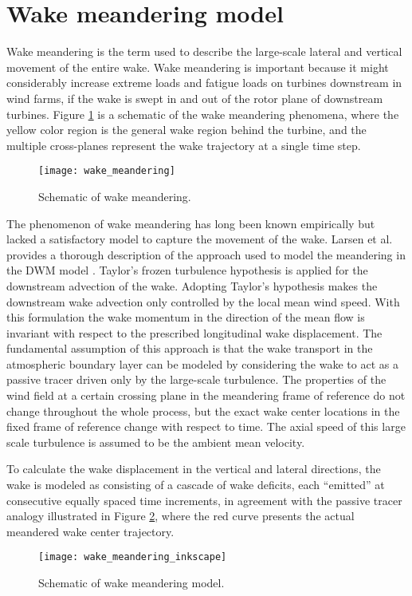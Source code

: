 \documentclass{umthesis}
\begin{document}
\section{Wake meandering model} \label{sec:wake_meandering}
Wake meandering is the term used to describe the large-scale lateral and vertical movement of the entire wake. Wake meandering is important because it might considerably increase extreme loads and fatigue loads on turbines downstream in wind farms, if the wake is swept in and out of the rotor plane of downstream turbines. Figure \ref{fig:wake_meandering} is a schematic of the wake meandering phenomena, where the yellow color region is the general wake region behind the turbine, and the multiple cross-planes represent the wake trajectory at a single time step.

\begin{figure}
  \centering
  \texttt{[image: wake\_meandering]}
  \caption{Schematic of wake meandering.}\label{fig:wake_meandering}
\end{figure}

The phenomenon of wake meandering has long been known empirically but lacked a satisfactory model to capture the movement of the wake. Larsen et al. provides a thorough description of the approach used to model the meandering in the DWM model \cite{Larsen_meandering}. Taylor's frozen turbulence hypothesis is applied for the downstream advection of the wake. Adopting Taylor's hypothesis makes the downstream wake advection only controlled by the local mean wind speed. With this formulation the wake momentum in the direction of the mean flow is invariant with respect to the prescribed longitudinal wake displacement. The fundamental assumption of this approach is that the wake transport in the atmospheric boundary layer can be modeled by considering the wake to act as a passive tracer driven only by the large-scale turbulence. The properties of the wind field at a certain crossing plane in the meandering frame of reference do not change throughout the whole process, but the exact wake center locations in the fixed frame of reference change with respect to time. The axial speed of this large scale turbulence is assumed to be the ambient mean velocity.

To calculate the wake displacement in the vertical and lateral directions, the wake is modeled as consisting of a cascade of wake deficits, each “emitted” at consecutive equally spaced time increments, in agreement with the passive tracer analogy \cite{Larsen_meandering} illustrated in Figure \ref{fig:wake_meandering_inkscape}, where the red curve presents the actual meandered wake center trajectory.
\begin{figure}
  \centering
  \texttt{[image: wake\_meandering\_inkscape]}
  \caption{Schematic of wake meandering model.}\label{fig:wake_meandering_inkscape}
\end{figure}
\end{document}
